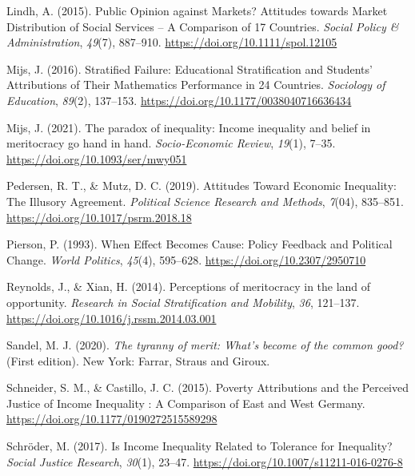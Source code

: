 \documentclass[
  12pt,
]{article}
\newlength{\cslhangindent}
\newlength{\cslentryspacingunit} %
\newenvironment{CSLReferences}[2] %
 {%
  \setlength{\parindent}{0pt}
  \ifodd #1
  \let\oldpar\par
  \def\par{\hangindent=\cslhangindent\oldpar}
  \fi
  \setlength{\parskip}{#2\cslentryspacingunit}
 }%
 {}
\begin{document}
\begin{CSLReferences}{1}{0}
\leavevmode{}%
Lindh, A. (2015). Public {Opinion} against {Markets}? {Attitudes}
towards {Market Distribution} of {Social Services} -- {A Comparison} of
17 {Countries}. \emph{Social Policy \& Administration}, \emph{49}(7),
887--910. \url{https://doi.org/10.1111/spol.12105}

\leavevmode{}%
Mijs, J. (2016). Stratified {Failure}: {Educational Stratification} and
{Students}' {Attributions} of {Their Mathematics Performance} in 24
{Countries}. \emph{Sociology of Education}, \emph{89}(2), 137--153.
\url{https://doi.org/10.1177/0038040716636434}

\leavevmode{}%
Mijs, J. (2021). The paradox of inequality: Income inequality and belief
in meritocracy go hand in hand. \emph{Socio-Economic Review},
\emph{19}(1), 7--35. \url{https://doi.org/10.1093/ser/mwy051}

\leavevmode{}%
Pedersen, R. T., \& Mutz, D. C. (2019). Attitudes {Toward Economic
Inequality}: {The Illusory Agreement}. \emph{Political Science Research
and Methods}, \emph{7}(04), 835--851.
\url{https://doi.org/10.1017/psrm.2018.18}

\leavevmode{}%
Pierson, P. (1993). When {Effect Becomes Cause}: {Policy Feedback} and
{Political Change}. \emph{World Politics}, \emph{45}(4), 595--628.
\url{https://doi.org/10.2307/2950710}

\leavevmode{}%
Reynolds, J., \& Xian, H. (2014). Perceptions of meritocracy in the land
of opportunity. \emph{Research in Social Stratification and Mobility},
\emph{36}, 121--137. \url{https://doi.org/10.1016/j.rssm.2014.03.001}

\leavevmode{}%
Sandel, M. J. (2020). \emph{The tyranny of merit: {What}'s become of the
common good?} (First edition). New York: {Farrar, Straus and Giroux}.

\leavevmode{}%
Schneider, S. M., \& Castillo, J. C. (2015). Poverty {Attributions} and
the {Perceived Justice} of {Income Inequality} : {A Comparison} of
{East} and {West Germany}.
\url{https://doi.org/10.1177/0190272515589298}

\leavevmode{}%
Schröder, M. (2017). Is {Income Inequality Related} to {Tolerance} for
{Inequality}? \emph{Social Justice Research}, \emph{30}(1), 23--47.
\url{https://doi.org/10.1007/s11211-016-0276-8}


\end{CSLReferences}
\end{document}
